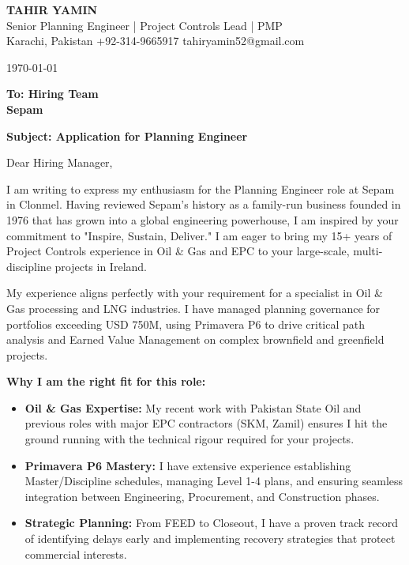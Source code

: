 \documentclass[11pt,a4paper]{article}
\begin{document}
\begin{center}
    {\Huge \textbf{\color{awesome-darknight} TAHIR YAMIN}} \\[0.2cm]
    {\Large \color{awesome-gray} Senior Planning Engineer | Project Controls Lead | PMP} \\[0.3cm]
    
    \small \color{light-gray}
    Karachi, Pakistan \quad \textbullet \quad 
    +92-314-9665917 \quad \textbullet \quad 
    tahiryamin52@gmail.com
\end{center}

\vspace{0.8cm}
\today
\vspace{0.5cm}

\textbf{To: Hiring Team} \\
\textbf{Sepam} \\
\vspace{0.5cm}

\textbf{Subject: Application for Planning Engineer}

\vspace{0.5cm}

Dear Hiring Manager,

I am writing to express my enthusiasm for the Planning Engineer role at Sepam in Clonmel. Having reviewed Sepam's history as a family-run business founded in 1976 that has grown into a global engineering powerhouse, I am inspired by your commitment to "Inspire, Sustain, Deliver." I am eager to bring my 15+ years of Project Controls experience in Oil \& Gas and EPC to your large-scale, multi-discipline projects in Ireland.

My experience aligns perfectly with your requirement for a specialist in Oil \& Gas processing and LNG industries. I have managed planning governance for portfolios exceeding USD 750M, using Primavera P6 to drive critical path analysis and Earned Value Management on complex brownfield and greenfield projects.

\textbf{Why I am the right fit for this role:}
\begin{itemize}
    \item \textbf{Oil \& Gas Expertise:} My recent work with Pakistan State Oil and previous roles with major EPC contractors (SKM, Zamil) ensures I hit the ground running with the technical rigour required for your projects.
    \item \textbf{Primavera P6 Mastery:} I have extensive experience establishing Master/Discipline schedules, managing Level 1-4 plans, and ensuring seamless integration between Engineering, Procurement, and Construction phases.
    \item \textbf{Strategic Planning:} From FEED to Closeout, I have a proven track record of identifying delays early and implementing recovery strategies that protect commercial interests.
\end{itemize}
\end{document}
